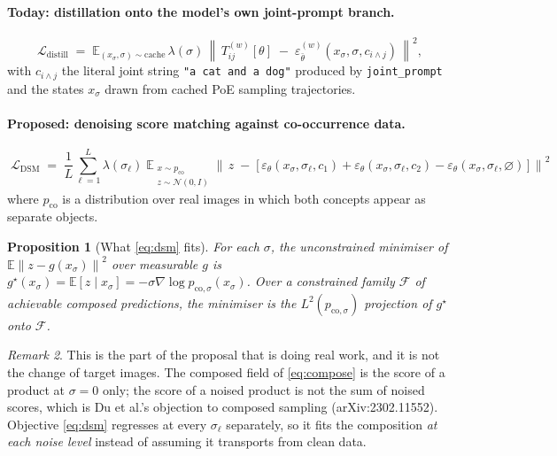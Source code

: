 \documentclass[11pt]{article}
\newcommand{\eps}{\varepsilon}
\newcommand{\epsth}{\eps_\theta}
\newcommand{\epsfr}{\eps_{\bar\theta}}
\newcommand{\xs}{x_\sigma}
\newcommand{\E}{\mathbb{E}}
\newcommand{\norm}[1]{\left\lVert #1 \right\rVert}
\newcommand{\cnull}{\varnothing}
\theoremstyle{plain}
\newtheorem{proposition}{Proposition}
\theoremstyle{remark}
\newtheorem{remark}[proposition]{Remark}
\begin{document}
\paragraph{Today: distillation onto the model's own joint-prompt branch.}
\begin{equation}
  \mathcal{L}_{\mathrm{distill}}
  \;=\;
  \E_{(\xs,\sigma)\sim \text{cache}}\,
  \lambda(\sigma)\,
  \norm{\,T^{(w)}_{ij}[\theta] \;-\; \epsfr^{(w)}(\xs,\sigma,c_{i\wedge j})\,}^2 ,
  \label{eq:distill}
\end{equation}
with $c_{i\wedge j}$ the literal joint string \texttt{"a cat and a dog"} produced by
\texttt{joint\_prompt} and the states $\xs$ drawn from cached PoE sampling trajectories.

\paragraph{Proposed: denoising score matching against co-occurrence data.}
\begin{equation}
  \boxed{\;
  \mathcal{L}_{\mathrm{DSM}}
  \;=\;
  \frac{1}{L}\sum_{\ell=1}^{L} \lambda(\sigma_\ell)\;
  \E_{\substack{x \sim p_{\mathrm{co}}\\ z \sim \mathcal{N}(0,I)}}
  \norm{\,z \;-\; \big[\,\epsth(\xs,\sigma_\ell,c_1) + \epsth(\xs,\sigma_\ell,c_2)
  - \epsth(\xs,\sigma_\ell,\cnull)\,\big]\,}^2 \;}
  \label{eq:dsm}
\end{equation}
where $p_{\mathrm{co}}$ is a distribution over real images in which both concepts appear as
separate objects.

\begin{proposition}[What \eqref{eq:dsm} fits]
\label{prop:minimiser}
For each $\sigma$, the unconstrained minimiser of $\E\norm{z - g(\xs)}^2$ over measurable $g$
is $g^\star(\xs) = \E[z \mid \xs] = -\sigma \nabla \log p_{\mathrm{co},\sigma}(\xs)$. Over a
constrained family $\mathcal{F}$ of achievable composed predictions, the minimiser is the
$L^2(p_{\mathrm{co},\sigma})$ projection of $g^\star$ onto $\mathcal{F}$.
\end{proposition}

\begin{remark}
This is the part of the proposal that is doing real work, and it is not the change of target
images. The composed field of \eqref{eq:compose} is the score of a product at $\sigma = 0$
only; the score of a noised product is not the sum of noised scores, which is Du et al.'s
objection to composed sampling (arXiv:2302.11552). Objective \eqref{eq:dsm} regresses at every
$\sigma_\ell$ separately, so it fits the composition \emph{at each noise level} instead of
assuming it transports from clean data.
\end{remark}
\end{document}
